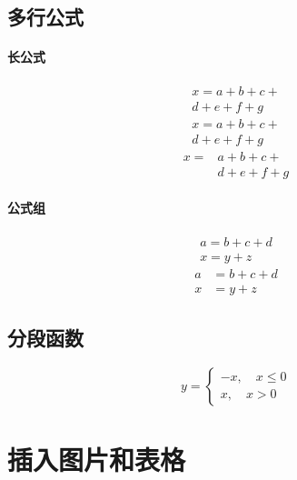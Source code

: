 \documentclass[UTF8]{ctexart}
\begin{document}
\subsection{多行公式}
\paragraph{长公式}
\begin{multline}
x = a + b + c + {} \\
d + e + f + g
\end{multline}
\begin{multline*}
x = a + b + c + {} \\
d + e + f + g
\end{multline*}
\[ \begin{aligned}
x = {}& a+b+c+{} \\
&d+e+f+g
\end{aligned} \]
\paragraph{公式组}
\begin{gather}
a = b+c+d \\
x = y+z
\end{gather}
\begin{align}
a &= b+c+d \\
x &= y+z
\end{align}

\subsection{分段函数}
\[ y = \begin{cases}
-x, \quad x\leq 0 \\
x, \quad x>0
\end{cases} \]

\section{插入图片和表格}
\end{document}
